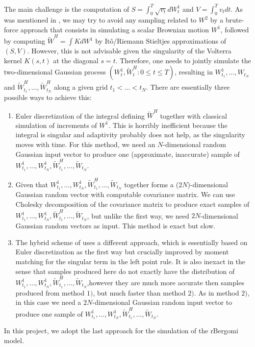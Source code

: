 \documentclass[11pt]{article}
\begin{document}
The main challenge is the computation of $S=\int_{0}^{T} \sqrt{v_t} dW_t^1$ and $V=\int_{0}^{T} v_t dt$. As was mentioned in \cite{bayer2017regularity}, we may try to
avoid any sampling related to $W^2$ by   a brute-force approach that  consists in simulating a scalar Brownian motion $W^1$, followed by computing  $\tilde{W}^H= \int K dW^1$  by It\^o/Riemann Stieltjes approximations of $(S,V)$. However, this is not advisable given the singularity of the Volterra kernel $K(s,t)$ at the diagonal $s = t$.
 Therefore,  one needs to jointly simulate the two-dimensional Gaussian process $(W_t^1, \tilde{W}^H_t: 0 \le t \le T)$, resulting in $W^1_{t_1},\dots, W_{t_N}$ and $\tilde{W}^H_{t_1},\dots, \tilde{W}^H_{t_N}$ along a given grid $t_1 <\dots < t_N$. There are essentially three possible ways to achieve this:
 \begin{enumerate}
 	\item Euler discretization of the integral defining $\tilde{W}^H$ together with classical simulation of increments of $W^1$. This is horribly inefficient because the integral is singular and adaptivity probably does not help, as the singularity moves with time. For this 	method, we need an $N$-dimensional random Gaussian input vector to produce one (approximate, inaccurate) sample of $W^1_{t_1},\dots, W^1_{t_N}, \tilde{W}^H_{t_1},\dots, \tilde{W}_{t_N}$.
 	
 	\item Given that $W^1_{t_1},\dots, W^1_{t_N}, \tilde{W}^H_{t_1},\dots, \tilde{W}_{t_N}$ together forms a ($2N$)-dimensional Gaussian random vector with computable covariance matrix. We can use Cholesky decomposition of the covariance matrix to produce exact samples of $W^1_{t_1},\dots, W^1_{t_N}, \tilde{W}^H_{t_1},\dots, \tilde{W}_{t_N}$, but unlike the first way, we need $2N$-dimensional Gaussian random vectors as
 	input. This method is exact but slow.
 	
 	\item  The hybrid scheme of \cite{bennedsen2017hybrid} uses a different approach, which is essentially based on  Euler discretization as the first way but crucially improved by moment
 	matching for the singular term in the left point rule. It is also
 	inexact in the sense that samples produced here do not exactly have the distribution of $W^1_{t_1},\dots, W^1_{t_N}, \tilde{W}^H_{t_1},\dots, \tilde{W}_{t_N}$,however they are much more accurate then samples produced from method $1)$, but much faster than method $2)$. As in method $2)$, in this case we need a $2N$-dimensional Gaussian random input vector to produce one
 	sample of $W^1_{t_1},\dots, W^1_{t_N}, \tilde{W}^H_{t_1},\dots, \tilde{W}_{t_N}$.
 \end{enumerate}
In this project, we adopt the last approach for the simulation of the rBergomi model.
\end{document}
